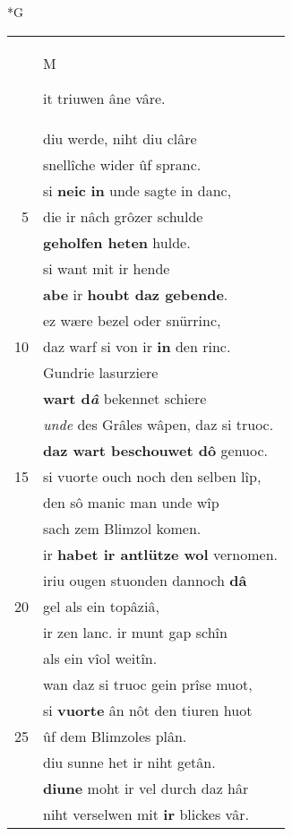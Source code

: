 \documentclass[8pt,a4paper,notitlepage]{article}
\begin{document}
\newpage
\begin{table}[ht]
\begin{minipage}[t]{0.5\linewidth}
\small
\begin{center}*G
\end{center}
\begin{tabular}{rl}
 & \begin{large}M\end{large}it triuwen âne vâre.\\ 
 & diu werde, niht diu clâre\\ 
 & snellîche wider ûf spranc.\\ 
 & si \textbf{neic} \textbf{in} unde sagte in danc,\\ 
5 & die ir nâch grôzer schulde\\ 
 & \textbf{geholfen heten} hulde.\\ 
 & si want mit ir hende\\ 
 & \textbf{abe} ir \textbf{houbt daz gebende}.\\ 
 & ez wære bezel oder snürrinc,\\ 
10 & daz warf si von ir \textbf{in} den rinc.\\ 
 & Gundrie lasurziere\\ 
 & \textbf{wart d\textit{â}} bekennet schiere\\ 
 & \textit{unde} des Grâles wâpen, daz si truoc.\\ 
 & \textbf{daz wart beschouwet dô} genuoc.\\ 
15 & si vuorte ouch noch den selben lîp,\\ 
 & den sô manic man unde wîp\\ 
 & sach zem Blimzol komen.\\ 
 & ir \textbf{habet ir antlütze wol} vernomen.\\ 
 & iriu ougen stuonden dannoch \textbf{dâ}\\ 
20 & gel als ein topâziâ,\\ 
 & ir zen lanc. ir munt gap schîn\\ 
 & als ein vîol weitîn.\\ 
 & wan daz si truoc gein prîse muot,\\ 
 & si \textbf{vuorte} ân nôt den tiuren huot\\ 
25 & ûf dem Blimzoles plân.\\ 
 & diu sunne het ir niht getân.\\ 
 & \textbf{diu}\textbf{ne} moht ir vel durch daz hâr\\ 
 & niht verselwen mit \textbf{ir} blickes vâr.\\ 

\end{tabular}
\end{minipage}
\end{table}
\end{document}
